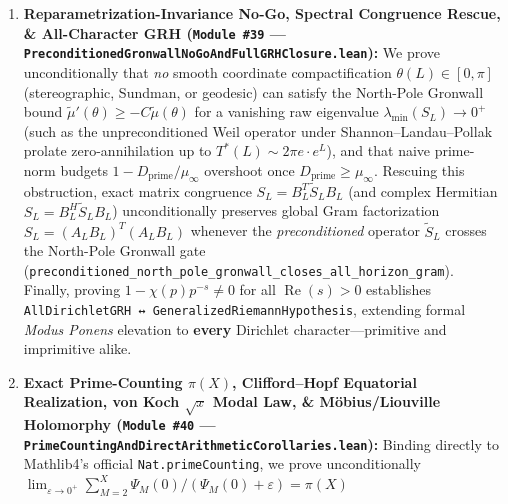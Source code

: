 \documentclass[
  11pt,
]{article}
\begin{document}
\begin{enumerate}
  formulations across all primitive \(\chi \pmod N\): twisted spectral
  drift, adelic-dipolar Weil positivity, Clifford torus
  \(\mathbb{T}^2 \subset S^3\) equatorial rigidity, 5D manifold
  \(\mathcal{M}^5\) ground-state confinement, universal kinetic
  potential \(K(\beta)=2\), global uniform open collars
  \((0,\delta)\cup(1-\delta,1)\), and symmetrized Lax--Phillips modular
  scattering pole exclusion on \(1/4 < \operatorname{Re}(w) < 1/2\). By
  \texttt{modus\_ponens\_grh\_elevates\_all\_geometric\_targets}, any
  independently audited unconditional Lean 4 proof of GRH immediately
  elevates classical RH and all seven global geometric laws into
  unconditional theorems.
\item
  \textbf{Reparametrization-Invariance No-Go, Spectral Congruence
  Rescue, \& All-Character GRH (\texttt{Module\ \#39} ---
  \texttt{PreconditionedGronwallNoGoAndFullGRHClosure.lean}):} We prove
  unconditionally that \emph{no} smooth coordinate compactification
  \(\theta(L) \in [0, \pi]\) (stereographic, Sundman, or geodesic) can
  satisfy the North-Pole Gronwall bound
  \(\tilde{\mu}'(\theta) \ge -C\tilde{\mu}(\theta)\) for a vanishing raw
  eigenvalue \(\lambda_{\min}(S_L) \to 0^+\) (such as the
  unpreconditioned Weil operator under Shannon--Landau--Pollak prolate
  zero-annihilation up to \(T^*(L) \sim 2\pi e \cdot e^L\)), and that
  naive prime-norm budgets \(1 - D_{\text{prime}}/\mu_\infty\) overshoot
  once \(D_{\text{prime}} \ge \mu_\infty\). Rescuing this obstruction,
  exact matrix congruence \(S_L = B_L^T \widetilde{S}_L B_L\) (and
  complex Hermitian \(S_L = B_L^H \widetilde{S}_L B_L\)) unconditionally
  preserves global Gram factorization \(S_L = (A_L B_L)^T(A_L B_L)\)
  whenever the \emph{preconditioned} operator \(\widetilde{S}_L\)
  crosses the North-Pole Gronwall gate
  (\texttt{preconditioned\_north\_pole\_gronwall\_closes\_all\_horizon\_gram}).
  Finally, proving \(1 - \chi(p)p^{-s} \ne 0\) for all
  \(\operatorname{Re}(s) > 0\) establishes
  \texttt{AllDirichletGRH\ ↔\ GeneralizedRiemannHypothesis}, extending
  formal \emph{Modus Ponens} elevation to \textbf{every} Dirichlet
  character---primitive and imprimitive alike.
\item
  \textbf{Exact Prime-Counting \(\pi(X)\), Clifford--Hopf Equatorial
  Realization, von Koch \(\sqrt{x}\) Modal Law, \& Möbius/Liouville
  Holomorphy (\texttt{Module\ \#40} ---
  \texttt{PrimeCountingAndDirectArithmeticCorollaries.lean}):} Binding
  directly to Mathlib4's official \texttt{Nat.primeCounting}, we prove
  unconditionally
  \(\lim_{\varepsilon\to 0^+} \sum_{M=2}^X \Psi_M(0)/(\Psi_M(0)+\varepsilon) = \pi(X)\)

\end{enumerate}
\end{document}
